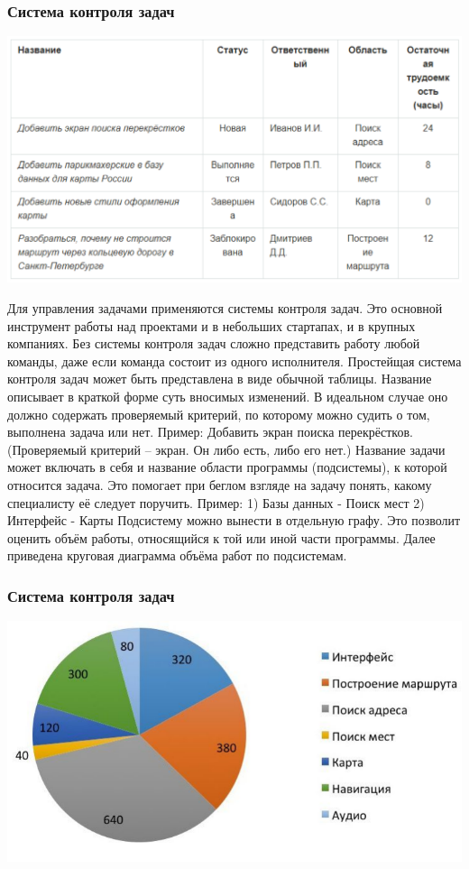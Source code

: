 \documentclass{../industrial-development}
\begin{document}
\begin{frame} \frametitle{Система контроля задач}
	\centerline{\includegraphics[width=1\textwidth]{gpstable.pdf}}
\end{frame}
\lecturenotes
Для управления задачами применяются системы контроля задач. Это основной инструмент работы над проектами и в небольших стартапах, и в крупных компаниях. Без системы контроля задач сложно представить работу любой команды, даже если команда состоит из одного исполнителя. Простейщая система контроля задач может быть представлена в виде обычной таблицы.
Название описывает в краткой форме суть вносимых изменений. В идеальном случае оно должно содержать проверяемый критерий, по которому можно судить о том, выполнена задача или нет.
Пример:
Добавить экран поиска перекрёстков. (Проверяемый критерий – экран. Он либо есть, либо его нет.)
Название задачи может включать в себя и название области программы (подсистемы), к которой относится задача. Это помогает при беглом взгляде на задачу понять, какому специалисту её следует поручить.
Пример:
1) Базы данных - Поиск мест
2) Интерфейс - Карты
Подсистему можно вынести в отдельную графу. Это позволит оценить объём работы, относящийся к той или иной части программы. Далее приведена круговая диаграмма объёма работ по подсистемам.

\begin{frame} \frametitle{Система контроля задач}
	\centerline{\includegraphics[width=1\textwidth]{circle.pdf}}
\end{frame}
\end{document}
